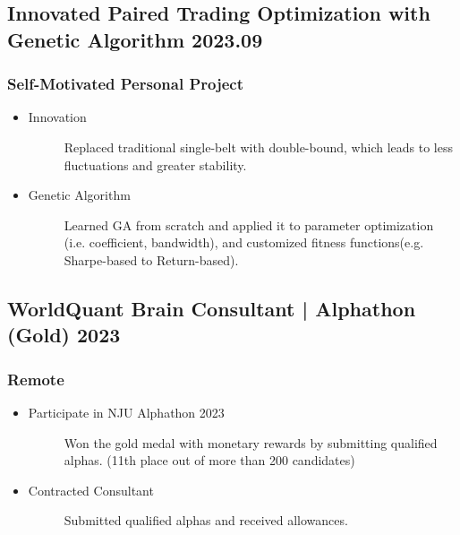 \documentclass[a4paper]{article}
\begin{document}
\subsection{Innovated Paired Trading Optimization with Genetic Algorithm \normalfont \hfill 2023.09}
\subsubsection{Self-Motivated Personal Project}
\begin{itemize}
    \item\begin{description}
        \item[Innovation] Replaced traditional single-belt with double-bound, which leads to less fluctuations and greater stability.
    \end{description}
    \item\begin{description}
        \item[Genetic Algorithm] Learned GA from scratch and applied it to parameter optimization (i.e. coefficient, bandwidth), and customized fitness functions(e.g. Sharpe-based to Return-based).
    \end{description}
\end{itemize}

\subsection{WorldQuant Brain Consultant | Alphathon (Gold) \normalfont  \hfill 2023}
\subsubsection{Remote}
\begin{itemize}
    \item\begin{description}
        \item[Participate in NJU Alphathon 2023] Won the gold medal with monetary rewards by submitting qualified alphas. (11th place out of more than 200 candidates)
    \end{description}
    \item\begin{description}
        \item[Contracted Consultant] Submitted qualified alphas and received allowances. 
    \end{description}
\end{itemize}  
\end{document}
